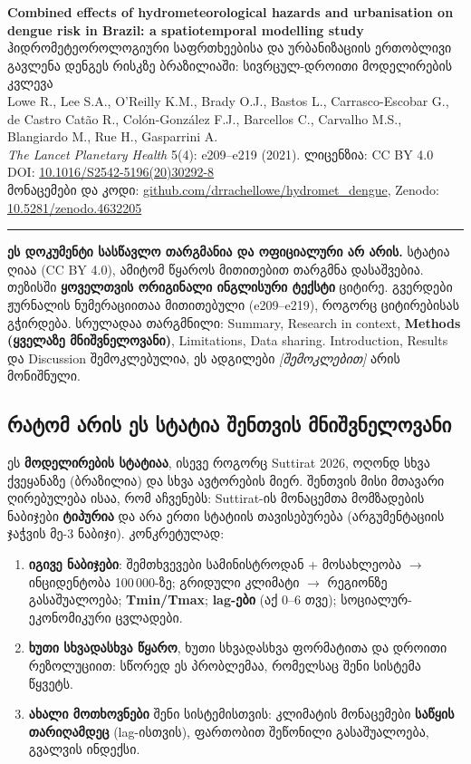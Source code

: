 \documentclass[11pt,a4paper]{article}
\newcommand{\imp}[1]{\textbf{\color{importred}#1}}
\begin{document}
\begin{center}
  {\Large\bfseries Combined effects of hydrometeorological hazards and urbanisation on dengue risk in Brazil: a spatiotemporal modelling study}\\[0.6em]
  {\large ჰიდრომეტეოროლოგიური საფრთხეებისა და ურბანიზაციის ერთობლივი გავლენა დენგეს რისკზე ბრაზილიაში: სივრცულ-დროითი მოდელირების კვლევა}\\[0.8em]
  Lowe R., Lee S.A., O'Reilly K.M., Brady O.J., Bastos L., Carrasco-Escobar G., de Castro Catão R.,
  Colón-González F.J., Barcellos C., Carvalho M.S., Blangiardo M., Rue H., Gasparrini A.\\
  \textit{The Lancet Planetary Health} 5(4): e209--e219 (2021). ლიცენზია: CC BY 4.0\\
  DOI: \href{https://doi.org/10.1016/S2542-5196(20)30292-8}{10.1016/S2542-5196(20)30292-8}\\
  მონაცემები და კოდი: \href{https://github.com/drrachellowe/hydromet_dengue}{github.com/drrachellowe/hydromet\_dengue},
  Zenodo: \href{https://doi.org/10.5281/zenodo.4632205}{10.5281/zenodo.4632205}
\end{center}

\noindent\rule{\linewidth}{0.4pt}

\noindent\textbf{ეს დოკუმენტი სასწავლო თარგმანია და ოფიციალური არ არის.} სტატია ღიაა (CC BY 4.0), ამიტომ წყაროს მითითებით
თარგმნა დასაშვებია. თეზისში \imp{ყოველთვის ორიგინალი ინგლისური ტექსტი} ციტირე. გვერდები ჟურნალის ნუმერაციითაა მითითებული
(e209--e219), როგორც ციტირებისას გჭირდება. სრულადაა თარგმნილი: Summary, Research in context, \textbf{Methods (ყველაზე მნიშვნელოვანი)},
Limitations, Data sharing. Introduction, Results და Discussion შემოკლებულია, ეს ადგილები \textit{[შემოკლებით]} არის მონიშნული.

\subsection*{რატომ არის ეს სტატია შენთვის მნიშვნელოვანი}
ეს \textbf{მოდელირების სტატიაა}, ისევე როგორც Suttirat 2026, ოღონდ სხვა ქვეყანაზე (ბრაზილია) და სხვა ავტორების მიერ.
შენთვის მისი მთავარი ღირებულება ისაა, რომ აჩვენებს: Suttirat-ის მონაცემთა მომზადების ნაბიჯები \imp{ტიპურია} და არა ერთი
სტატიის თავისებურება (არგუმენტაციის ჯაჭვის მე-3 ნაბიჯი). კონკრეტულად:
\begin{enumerate}[leftmargin=1.5em]
  \item \textbf{იგივე ნაბიჯები}: შემთხვევები სამინისტროდან + მოსახლეობა $\rightarrow$ ინციდენტობა 100\,000-ზე; გრიდული კლიმატი
    $\rightarrow$ რეგიონზე გასაშუალოება; \textbf{Tmin/Tmax}; \textbf{lag-ები} (აქ 0--6 თვე); სოციალურ-ეკონომიკური ცვლადები.
  \item \textbf{ხუთი სხვადასხვა წყარო}, ხუთი სხვადასხვა ფორმატითა და დროითი რეზოლუციით: სწორედ ეს პრობლემაა, რომელსაც შენი სისტემა წყვეტს.
  \item \textbf{ახალი მოთხოვნები} შენი სისტემისთვის: კლიმატის მონაცემები \imp{საწყის თარიღამდეც} (lag-ისთვის), ფართობით შეწონილი
    გასაშუალოება, გვალვის ინდექსი.
\end{enumerate}
\end{document}
